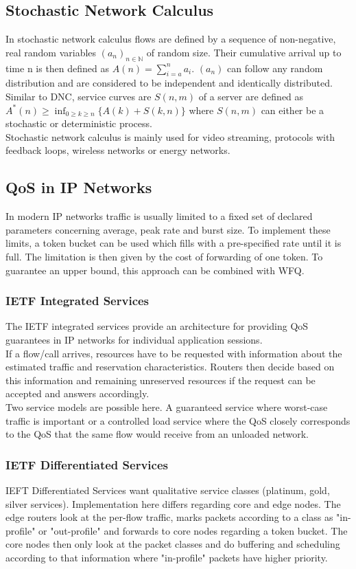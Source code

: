 \subsection{Stochastic Network Calculus}
In stochastic network calculus flows are defined by a sequence of non-negative, real random variables $(a_n)_{n \in \mathds{N}}$ of random size.
Their cumulative arrival up to time n is then defined as $A(n) = \sum^n_{i=a}a_i$.
$(a_n)$ can follow any random distribution and are considered to be independent and identically distributed.
Similar to DNC, service curves are $S(n,m)$ of a server are defined as $A^*(n) \geq \inf_{0 \geq k \geq n} \{A(k) + S(k,n)\}$ where $S(n,m)$ can either be a stochastic or deterministic process.\\

Stochastic network calculus is mainly used for video streaming, protocols with feedback loops, wireless networks or energy networks.

\subsection{QoS in IP Networks}
In modern IP networks traffic is usually limited to a fixed set of declared parameters concerning average, peak rate and burst size.
To implement these limits, a token bucket can be used which fills with a pre-specified rate until it is full.
The limitation is then given by the cost of forwarding of one token.
To guarantee an upper bound, this approach can be combined with WFQ.

\subsubsection*{IETF Integrated Services}
The IETF integrated services provide an architecture for providing QoS guarantees in IP networks for individual application sessions.\\
If a flow/call arrives, resources have to be requested with information about the estimated traffic and reservation characteristics.
Routers then decide based on this information and remaining unreserved resources if the request can be accepted and answers accordingly.\\
Two service models are possible here.
A guaranteed service where worst-case traffic is important or a controlled load service where the QoS closely corresponds to the QoS that the same flow would receive from an unloaded network.

\subsubsection*{IETF Differentiated Services}
IEFT Differentiated Services want qualitative service classes (platinum, gold, silver services).
Implementation here differs regarding core and edge nodes.
The edge routers look at the per-flow traffic, marks packets according to a class as "in-profile" or "out-profile" and forwards to core nodes regarding a token bucket.
The core nodes then only look at the packet classes and do buffering and scheduling according to that information where "in-profile" packets have higher priority.

